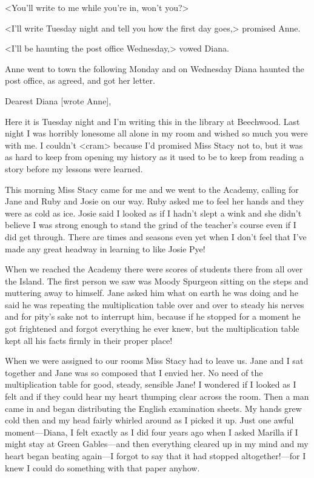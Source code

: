 <You'll write to me while you're in, won't you?>

<I'll write Tuesday night and tell you how the first day goes,> promised Anne.

<I'll be haunting the post office Wednesday,> vowed Diana.

Anne went to town the following Monday and on Wednesday Diana haunted the post office, as agreed, and got her letter.

\begin{mail}{}{Dearest Diana [wrote Anne],}

Here it is Tuesday night and I'm writing this in the library at Beechwood. Last night I was horribly lonesome all alone in my room and wished so much you were with me. I couldn't <cram> because I'd promised Miss Stacy not to, but it was as hard to keep from opening my history as it used to be to keep from reading a story before my lessons were learned.

This morning Miss Stacy came for me and we went to the Academy, calling for Jane and Ruby and Josie on our way. Ruby asked me to feel her hands and they were as cold as ice. Josie said I looked as if I hadn't slept a wink and she didn't believe I was strong enough to stand the grind of the teacher's course even if I did get through. There are times and seasons even yet when I don't feel that I've made any great headway in learning to like Josie Pye!

When we reached the Academy there were scores of students there from all over the Island. The first person we saw was Moody Spurgeon sitting on the steps and muttering away to himself. Jane asked him what on earth he was doing and he said he was repeating the multiplication table over and over to steady his nerves and for pity's sake not to interrupt him, because if he stopped for a moment he got frightened and forgot everything he ever knew, but the multiplication table kept all his facts firmly in their proper place!

When we were assigned to our rooms Miss Stacy had to leave us. Jane and I sat together and Jane was so composed that I envied her. No need of the multiplication table for good, steady, sensible Jane! I wondered if I looked as I felt and if they could hear my heart thumping clear across the room. Then a man came in and began distributing the English examination sheets. My hands grew cold then and my head fairly whirled around as I picked it up. Just one awful moment—Diana, I felt exactly as I did four years ago when I asked Marilla if I might stay at Green Gables—and then everything cleared up in my mind and my heart began beating again—I forgot to say that it had stopped altogether!—for I knew I could do something with that paper anyhow.


\end{mail}
